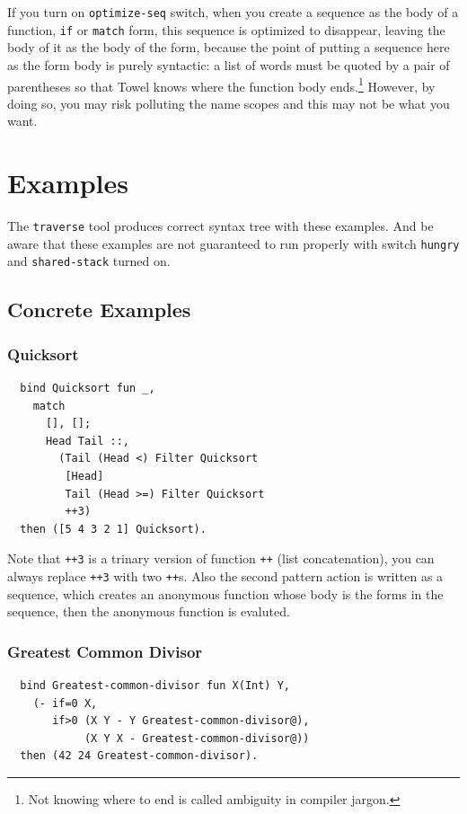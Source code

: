 \documentclass{book}
\begin{document}
If you turn on \texttt{optimize-seq} switch, when you create a sequence as the body of a function, \texttt{if} or \texttt{match} form, this sequence is optimized to disappear, leaving the body of it as the body of the form, because the point of putting a sequence here as the form body is purely syntactic: a list of words must be quoted by a pair of parentheses so that Towel knows where the function body ends.\footnote{Not knowing where to end is called ambiguity in compiler jargon.} However, by doing so, you may risk polluting the name scopes and this may not be what you want.

\chapter{Examples}
\label{chap:examples}

The \texttt{traverse} tool produces correct syntax tree with these examples. And be aware that these examples are not guaranteed to run properly with switch \texttt{hungry} and \texttt{shared-stack} turned on.

\section{Concrete Examples}
\subsection{Quicksort}
\begin{verbatim}
  bind Quicksort fun _,
    match
      [], [];
      Head Tail ::,
        (Tail (Head <) Filter Quicksort
         [Head]
         Tail (Head >=) Filter Quicksort
         ++3)
  then ([5 4 3 2 1] Quicksort).
\end{verbatim}

Note that \texttt{++3} is a trinary version of function \texttt{++} (list concatenation), you can always replace \texttt{++3} with two \texttt{++}s. Also the second pattern action is written as a sequence, which creates an anonymous function whose body is the forms in the sequence, then the anonymous function is evaluted.

\subsection{Greatest Common Divisor}
\begin{verbatim}
  bind Greatest-common-divisor fun X(Int) Y,
    (- if=0 X,
       if>0 (X Y - Y Greatest-common-divisor@),
            (X Y X - Greatest-common-divisor@))
  then (42 24 Greatest-common-divisor).
\end{verbatim}
\end{document}
